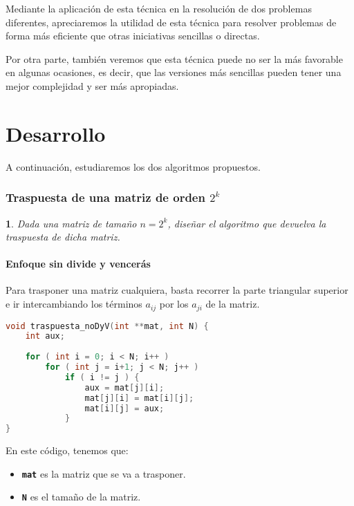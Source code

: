 \documentclass[10pt, a4paper]{article}
\theoremstyle{theorem-style}
\newtheorem*{datos}{}
\theoremstyle{theorem-style}
\theoremstyle{definition-style}
\theoremstyle{remark-style}
\theoremstyle{example-style}
\theoremstyle{definition-style}
\theoremstyle{remark-style}
\begin{document}
Mediante la aplicación de esta técnica en la resolución de dos problemas diferentes, apreciaremos la utilidad de esta técnica para resolver problemas de forma más eficiente que otras iniciativas sencillas o directas.

Por otra parte, también veremos que esta técnica puede no ser la más favorable en algunas ocasiones, es decir, que las versiones más sencillas pueden tener una mejor complejidad y ser más apropiadas.

\pagebreak
\part{Desarrollo}

A continuación, estudiaremos los dos algoritmos propuestos.

\section{Traspuesta de una matriz de orden $2^k$}

\begin{datos}
	{\sffamily Dada una matriz de tamaño $n=2^k$, diseñar el algoritmo que devuelva la traspuesta de dicha matriz.}
\end{datos}

\subsection{Enfoque sin divide y vencerás}

Para trasponer una matriz cualquiera, basta recorrer la parte triangular superior e ir intercambiando los términos $a_{ij}$ por los $a_{ji}$ de la matriz.\\

\begin{lstlisting}[language=C]
void traspuesta_noDyV(int **mat, int N) {
	int aux;
	
	for ( int i = 0; i < N; i++ )
		for ( int j = i+1; j < N; j++ )
			if ( i != j ) {
				aux = mat[j][i];
				mat[j][i] = mat[i][j];
				mat[i][j] = aux;
			}
}
\end{lstlisting}

En este código, tenemos que:
\begin{itemize}
	\item \textbf{\texttt{mat}} es la matriz que se va a trasponer.
	\item \textbf{\texttt{N}} es el tamaño de la matriz.
\end{itemize}
\end{document}
